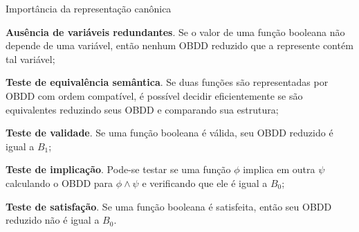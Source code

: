 \expandafter\documentclass\expandafter[table, usenames, svgnames, dvipsnames,14pt, \classopts]{beamer}
\begin{document}
\begin{frame}{Importância da representação canônica}

    \scriptsize

    \begin{outline}
        \1 \textbf{Ausência de variáveis redundantes}. Se o valor de uma função booleana não depende de uma variável, então nenhum OBDD reduzido que a represente contém tal variável;
        
        \vspace{1em}
        
        \1 \textbf{Teste de equivalência semântica}. Se duas funções são representadas por OBDD com ordem compatível, é possível decidir eficientemente se são equivalentes reduzindo seus OBDD e comparando sua estrutura;
            
        \vspace{1em}
        
        \1 \textbf{Teste de validade}. Se uma função booleana é válida, seu OBDD reduzido é igual a $B_1$;
        
        \vspace{1em}
        
        \1 \textbf{Teste de implicação}. Pode-se testar se uma função $\phi$ implica em outra $\psi$ calculando o OBDD para $\phi \land \psi$ e verificando que ele é igual a $B_0$;
        
        \vspace{1em}
        
        \1 \textbf{Teste de satisfação}. Se uma função booleana é satisfeita, então seu OBDD reduzido não é igual a $B_0$.
    \end{outline}

\end{frame}







\end{document}
